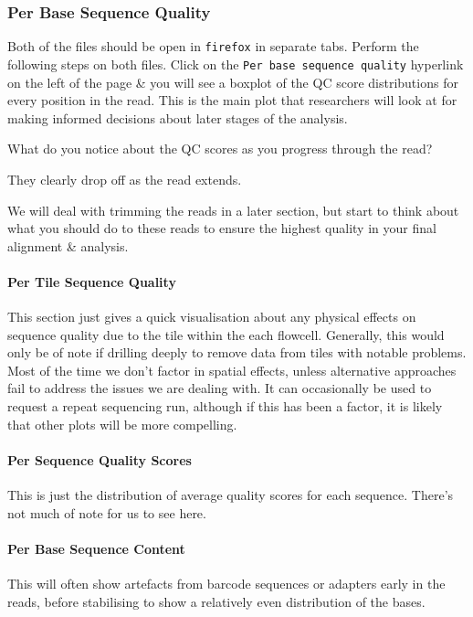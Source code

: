 \subsubsection*{Per Base Sequence Quality}
\begin{steps}
Both of the files should be open in \texttt{firefox} in separate tabs.
Perform the following steps on both files.
Click on the \texttt{Per base sequence quality} hyperlink on the left of the page \& you will see a boxplot of the QC score distributions for every position in the read.
This is the main plot that researchers will look at for making informed decisions about later stages of the analysis.
\end{steps}

\begin{questions}
What do you notice about the QC scores as you progress through the read? \\
\begin{answer}
They clearly drop off as the read extends.\\
\end{answer}
\end{questions}

We will deal with trimming the reads in a later section, but start to think about what you should do to these reads to ensure the highest quality in your final alignment \& analysis.

\paragraph{Per Tile Sequence Quality}
This section just gives a quick visualisation about any physical effects on sequence quality due to the tile within the each flowcell.
Generally, this would only be of note if drilling deeply to remove data from tiles with notable problems.
Most of the time we don't factor in spatial effects, unless alternative approaches fail to address the issues we are dealing with.
It can occasionally be used to request a repeat sequencing run, although if this has been a factor, it is likely that other plots will be more compelling.

\paragraph*{Per Sequence Quality Scores}
This is just the distribution of average quality scores for each sequence.
There's not much of note for us to see here.

\paragraph{Per Base Sequence Content}
This will often show artefacts from barcode sequences or adapters early in the reads, before stabilising to show a relatively even distribution of the bases.

